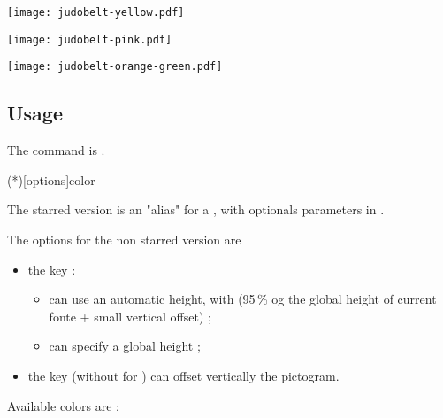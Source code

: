 \documentclass[english,11pt,a4paper]{article}
\begin{document}
\begin{demohigh}[language=latex/latex3,style/main=cyan!10,style/code=cyan!10,style/demo=cyan!10]
\texttt{[image: judobelt-yellow.pdf]}\par
\texttt{[image: judobelt-pink.pdf]}\par
\texttt{[image: judobelt-orange-green.pdf]}
\end{demohigh}

\subsection{Usage}

The command is .

\begin{codehigh}[language=latex/latex2,style/main=cyan!10,style/code=cyan!10]
\ColorBelt(*)[options]{color}
\end{codehigh}

The starred version is an "alias" for a , with optionals parameters in \MontreCode{[...]}.

\medskip

The options for the non starred version are

\begin{itemize}[leftmargin=*]
	\item the key  :
	\begin{itemize}
		\item can use an automatic height, with  (95\,\% og the global height of current fonte + small vertical offset) ;
		\item can specify a global height ;
	\end{itemize}
	\item the key  (without  for ) can offset vertically the pictogram.
\end{itemize}

Available colors are :
\end{document}
